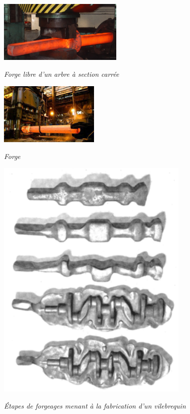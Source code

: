 \documentclass[11pt,oneside]{article}
\begin{document}
\begin{minipage}[c]{.3\linewidth}
\begin{center}
\includegraphics[height=3cm]{png/forge_libre}

\textit{Forge libre d'un arbre à section carrée \cite{forgelibre}}
\end{center}
\end{minipage}\hfill
\begin{minipage}[c]{.3\linewidth}
\begin{center}
\includegraphics[height=3cm]{png/forge}

\textit{Forge}
\end{center}
\end{minipage}\hfill
\begin{minipage}[c]{.3\linewidth}
\begin{center}
\includegraphics[width=0.7\textwidth]{png/estampage}

\textit{Étapes de forgeages menant à la fabrication d'un vilebrequin}
\end{center}
\end{minipage}
\end{document}
